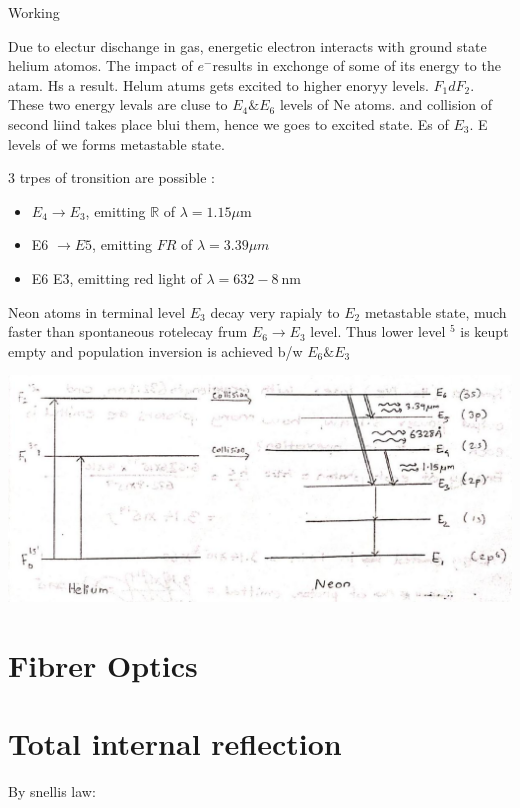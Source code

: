 \documentclass[10pt]{article}
\begin{document}
Working

Due to electur dischange in gas, energetic electron interacts with ground state helium atomos. The impact of $e^{-}$results in exchonge of some of its energy to the atam. Hs a result. Helum atums gets excited to higher enoryy levels. $F_{1} d F_{2}$. These two energy levals are cluse to $E_{4} \& E_{6}$ levels of Ne atoms. and collision of second liind takes place blui them, hence we goes to excited state. Es of $E_{3}$. E levels of we forms metastable state.

3 trpes of tronsition are possible :

\begin{itemize}
  \item $E_{4} \rightarrow E_{3}$, emitting $\mathbb{R}$ of $\lambda=1.15 \mu \mathrm{m}$
  \item E6 $\rightarrow E 5$, emitting $F R$ of $\lambda=3.39 \mu m$
  \item E6 E3, emitting red light of $\lambda=632-8 \mathrm{~nm}$
\end{itemize}

Neon atoms in terminal level $E_{3}$ decay very rapialy to $E_{2}$ metastable state, much faster than spontaneous rotelecay frum $E_{6} \rightarrow E_{3}$ level. Thus lower level ${ }^{5}$ is keupt empty and population inversion is achieved b/w $E_{6} \& E_{3}$

\begin{center}
\includegraphics[max width=\textwidth]{2024_06_16_30d750483617f1939202g-04}
\end{center}

\section*{Fibrer Optics}
\section*{Total internal reflection}
By snellis law:
\end{document}
